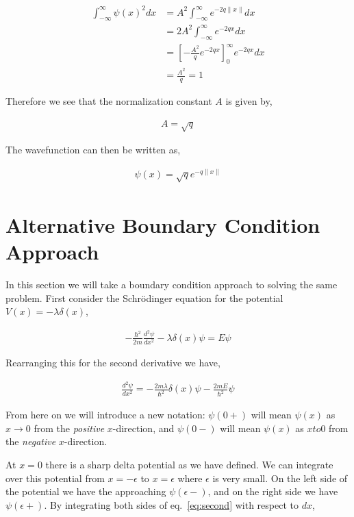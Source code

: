 \documentclass[11pt]{amsart}
\begin{document}
\begin{align*}
  \int_{-\infty}^{\infty}\psi(x)^2 dx &= A^2\int_{-\infty}^{\infty} e^{-2q\|x\|} dx \\
                                      &= 2A^2\int_{-\infty}^{\infty} e^{-2qx} dx \\
                                      &= {\left[-\frac{A^2}{q}e^{-2qx}\right]}^{\infty}_0 e^{-2qx} dx \\
                                      &= \frac{A^2}{q} = 1
\end{align*}

Therefore we see that the normalization constant $A$ is given by,

\begin{align*}
  A = \sqrt{q}
\end{align*}

The wavefunction can then be written as,

\begin{align*}
  \psi(x) = \sqrt{q}e^{-q\|x\|}
\end{align*}

\section{Alternative Boundary Condition Approach}

In this section we will take a boundary condition approach to solving the same problem. First consider the Schr\"{o}dinger equation for the potential $V(x) = -\lambda\delta(x)$,

\begin{align*}
  -\frac{\hbar^2}{2m}\frac{d^2\psi}{dx^2} - \lambda\delta(x)\psi = E\psi
\end{align*}

Rearranging this for the second derivative we have,

\begin{align}
  \label{eq:second}
  \frac{d^2\psi}{dx^2} = -\frac{2m\lambda}{\hbar^2}\delta(x)\psi - \frac{2mE}{\hbar^2}\psi
\end{align}

From here on we will introduce a new notation: $\psi(0+)$ will mean $\psi(x)$ as $x \to 0$ from the \textit{positive} $x$-direction, and $\psi(0-)$ will mean $\psi(x)$ as $x to 0$ from the \textit{negative} $x$-direction.

At $x = 0$ there is a sharp delta potential as we have defined. We can integrate over this potential from $x = -\epsilon$ to $x = \epsilon$ where $\epsilon$ is very small. On the left side of the potential we have the approaching $\psi(\epsilon-)$, and on the right side we have $\psi(\epsilon+)$. By integrating both sides of eq.~\ref{eq:second} with respect to $dx$,
\end{document}
